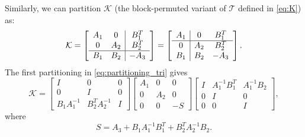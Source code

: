 \documentclass{article}
\newcommand{\sK}{\mathcal{K}}
\newcommand{\sT}{\mathcal{T}}
\begin{document}
Similarly, we can partition $\sK$ (the block-permuted variant of $\sT$ defined in \eqref{eq:K}) as: 
\begin{equation}
\label{eq:partitioning_tri}
 \sK = \left[ \begin{array}{c c | c}
    A_1 & 0 & B_1^T \\
    0 & A_2 & B_2^T \\
    \hline
    B_1 & B_2 & -A_3
    \end{array}
\right] = \left[ \begin{array}{c | c c}
    A_1 & 0 & B_1^T \\
    \hline
    0 & A_2 & B_2^T \\
    B_1 & B_2 & -A_3
    \end{array}
\right].
\end{equation}
The first partitioning in \eqref{eq:partitioning_tri} gives
\[
\sK = \begin{bmatrix}
    I & 0 & 0 \\
    0 & I & 0 \\
    B_1 A_1^{-1} & B_2^T A_2^{-1} & I
\end{bmatrix} \begin{bmatrix}
    A_1 & 0 & 0 \\
    0 & A_2 & 0 \\
    0 & 0 & -S
\end{bmatrix}\begin{bmatrix}
    I & A_1^{-1}B_1^T & A_1^{-1}B_2 \\
    0 & I & 0 \\
    0 & 0 & I
\end{bmatrix},
\]
where
\[
S = A_3 + B_1A_1^{-1}B_1^T + B_2^T A_2^{-1}B_2.
\]
\end{document}
